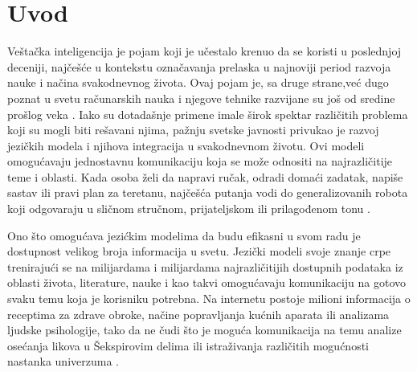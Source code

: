 \documentclass[12pt,oneside]{memoir}
\begin{document}
\frontmatter
\naslovna
\komisija
\apstrakt
\tableofcontents*

\mainmatter

\chapter{Uvod}
Veštačka inteligencija je pojam koji je učestalo krenuo da se koristi u poslednjoj deceniji, najčešće u kontekstu označavanja prelaska u najnoviji period razvoja nauke i načina svakodnevnog života. Ovaj pojam je, sa druge strane,već dugo poznat u svetu računarskih nauka i njegove tehnike razvijane su još od sredine prošlog veka \cite{AIOrigins}. Iako su dotadašnje primene imale širok spektar različitih problema koji su mogli biti rešavani njima, pažnju svetske javnosti privukao je razvoj jezičkih modela i njihova integracija u svakodnevnom životu. Ovi modeli omogućavaju jednostavnu komunikaciju koja se može odnositi na najrazličitije teme i oblasti. Kada osoba želi da napravi ručak, odradi domaći zadatak, napiše sastav ili pravi plan za teretanu, najčešća putanja vodi do generalizovanih robota koji odgovaraju u sličnom stručnom, prijateljskom ili prilagođenom tonu \cite{LLMUsageSurvey}. 

Ono što omogućava jezićkim modelima da budu efikasni u svom radu je dostupnost velikog broja informacija u svetu. Jezički modeli svoje znanje crpe trenirajući se na milijardama i milijardama najrazličitijih dostupnih podataka iz oblasti života, literature, nauke i kao takvi omogućavaju komunikaciju na gotovo svaku temu koja je korisniku potrebna. Na internetu postoje milioni informacija o receptima za zdrave obroke, načine popravljanja kućnih aparata ili analizama ljudske psihologije, tako da ne čudi što je moguća komunikacija na temu analize osećanja likova u Šekspirovim delima ili istraživanja različitih mogućnosti nastanka univerzuma \cite{DataInAI}.
\end{document}
